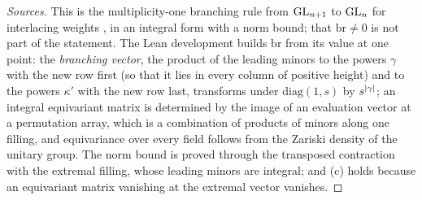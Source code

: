 \begin{proof}[Sources]
This is the multiplicity-one branching rule from $\operatorname{GL}_{n+1}$ to $\operatorname{GL}_n$ for interlacing weights \cite[Thm.~8.1.1]{GoodmanWallach2009}, in an integral form with a norm bound; that $\mathrm{br}\ne0$ is not part of the statement. The Lean development builds $\mathrm{br}$ from its value at one point: the \emph{branching vector}, the product of the leading minors to the
powers $\gamma$ with the new row first (so that it lies in every column of positive height) and to the powers $\kappa'$ with the new row last, transforms under $\mathrm{diag}(1,s)$ by $s^{\lvert \gamma\rvert}$; an integral equivariant matrix is determined by the image of an evaluation vector at a permutation array, which is a combination of products of
minors along one filling, and equivariance over every field follows from the Zariski density of the unitary group. The norm bound is proved through the transposed contraction with the extremal filling, whose leading minors are integral; and (c) holds because an equivariant matrix vanishing at the extremal vector vanishes.
\end{proof}
